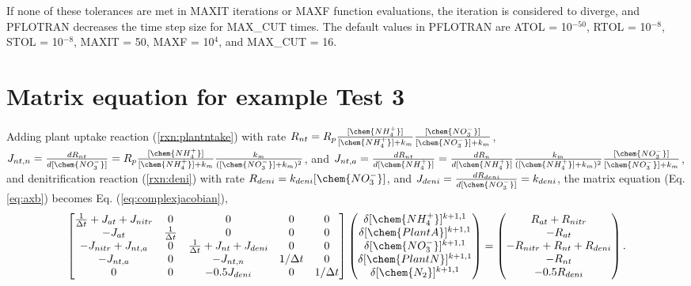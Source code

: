 \documentclass[gmd, manuscript]{copernicus}
\begin{document}
If none of these tolerances are met in MAXIT iterations or MAXF function
evaluations, the iteration is considered to diverge, and PFLOTRAN decreases the
time step size for MAX\_CUT times. The default values in PFLOTRAN are ATOL =
10$^{-50}$, RTOL = 10$^{-8}$, STOL = 10$^{-8}$,  %
MAXIT = 50, MAXF = 10$^4$, and MAX\_CUT = 16.

\section{Matrix equation for example Test 3}
\label{sec:eqtest3}
Adding plant  uptake reaction (\ref{rxn:plantntake}) with rate
$R_{nt}=R_p\frac{[\chem{NH_4^+}]}{[\chem{NH_4^+}] +
k_m}\frac{[\chem{NO_3^-}]}{[\chem{NO_3^-}] + k_m}$, $J_{nt,n}
=\frac{dR_{nt}}{d[\chem{NO_3^-}]}=R_p\frac{[\chem{NH_4^+}]}{[\chem{NH_4^+}] +
k_m}\frac{k_m}{([\chem{NO_3^-}] + k_m)^2}$, and $J_{nt,a} =
\frac{dR_{nt}}{d[\chem{NH_4^+}]}=\frac{dR_n}{d[\chem{NH_4^+}]}
\frac{k_m}{([\chem{NH_4^+}] + k_m)^2}\frac{[\chem{NO_3^-}]}{[\chem{NO_3^-}] +
k_m}$, and denitrification reaction
(\ref{rxn:deni}) with rate $R_{deni}=k_{deni} [\chem{NO_3^-}]$, and $J_{deni} =
\frac{dR_{deni}}{d[\chem{NO_3^-}]}=k_{deni}$, the matrix equation (Eq. \ref{eq:axb}) becomes  
Eq. (\ref{eq:complexjacobian}),
\begin{equation}
\label{eq:complexjacobian}
\left[
\begin{matrix}
\frac{1}{\Delta t} + J_{at} + J_{nitr} & 0                  & 0                                   &0 & 0\\
-J_{at}                              & \frac{1}{\Delta t} & 0 &0 &0\\
-J_{nitr} + J_{nt,a}                 & 0                  & \frac{1}{\Delta t} + J_{nt} + J_{deni}&0 &0 \\
-J_{nt,a}                            & 0                  & -J_{nt,n}                             &1/\Delta t & 0 \\
 0                                   & 0                  & -0.5J_{deni}                             & 0 &1/\Delta t
\end{matrix}
\right]
\left(
\begin{matrix}
\delta [\chem{NH_4^+}]^{k+1,1} \\
\delta [\chem{PlantA}]^{k+1,1} \\
\delta [\chem{NO_3^-}]^{k+1,1} \\ 
\delta [\chem{PlantN}]^{k+1,1} \\
\delta [\chem{N_2}]^{k+1,1} 
\end{matrix}
\right)
=
\left(
\begin{matrix}
R_{at} + R_{nitr} \\
-R_{at} \\
-R_{nitr} + R_{nt} + R_{deni} \\
-R_{nt} \\
-0.5R_{deni}
\end{matrix}
\right).
\end{equation}


\end{document}
